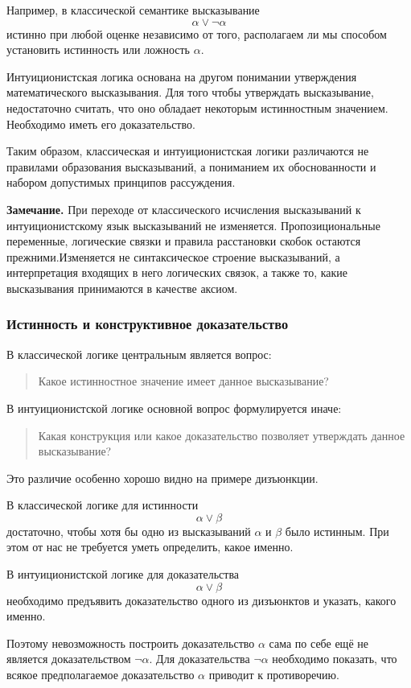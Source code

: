 \documentclass[12pt,a4paper,oneside,openany]{book}
\theoremstyle{definition}
\theoremstyle{plain}
\theoremstyle{remark}
\begin{document}
Например, в классической семантике высказывание
\[
\alpha\lor\neg\alpha
\]
истинно при любой оценке независимо от того, располагаем ли мы
способом установить истинность или ложность \(\alpha\).

Интуиционистская логика основана на другом понимании утверждения
математического высказывания. Для того чтобы утверждать
высказывание, недостаточно считать, что оно обладает некоторым
истинностным значением. Необходимо иметь его доказательство.

Таким образом, классическая и интуиционистская логики различаются
не правилами образования высказываний, а пониманием их обоснованности
и набором допустимых принципов рассуждения.

\textbf{Замечание.}
При переходе от классического исчисления высказываний к
интуиционистскому язык высказываний не изменяется. Пропозициональные
переменные, логические связки и правила расстановки скобок остаются
прежними.Изменяется не синтаксическое строение высказываний, а
интерпретация входящих в него логических связок, а также
то, какие высказывания принимаются в качестве аксиом.

\subsubsection{Истинность и конструктивное доказательство}

В классической логике центральным является вопрос:

\begin{quote}
Какое истинностное значение имеет данное высказывание?
\end{quote}

В интуиционистской логике основной вопрос формулируется иначе:

\begin{quote}
Какая конструкция или какое доказательство позволяет утверждать
данное высказывание?
\end{quote}

Это различие особенно хорошо видно на примере дизъюнкции.

В классической логике для истинности
\[
\alpha\lor\beta
\]
достаточно, чтобы хотя бы одно из высказываний \(\alpha\) и \(\beta\)
было истинным. При этом от нас не требуется уметь определить, какое
именно.

В интуиционистской логике для доказательства
\[
\alpha\lor\beta
\]
необходимо предъявить доказательство одного из дизъюнктов и указать,
какого именно.

Поэтому невозможность построить доказательство \(\alpha\) сама по себе
ещё не является доказательством \(\neg\alpha\). Для доказательства
\(\neg\alpha\) необходимо показать, что всякое предполагаемое
доказательство \(\alpha\) приводит к противоречию.
\end{document}
